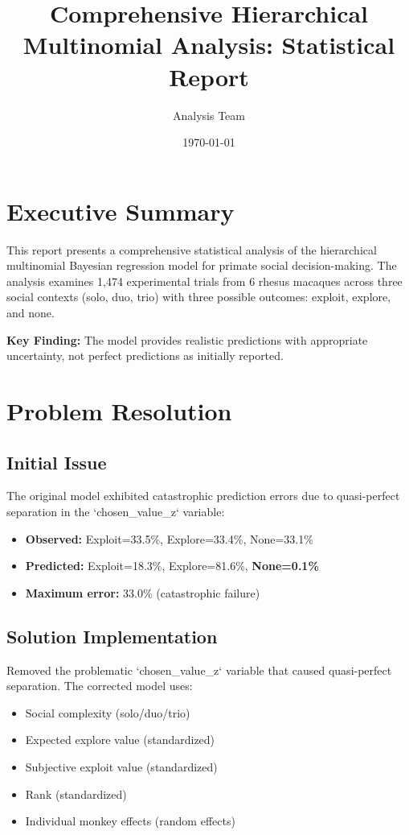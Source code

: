 \documentclass[11pt]{article}
\title{\textbf{Comprehensive Hierarchical Multinomial Analysis: Statistical Report}}
\author{Analysis Team}
\date{\today}
\begin{document}
\maketitle

\section{Executive Summary}

This report presents a comprehensive statistical analysis of the hierarchical multinomial Bayesian regression model for primate social decision-making. The analysis examines 1,474 experimental trials from 6 rhesus macaques across three social contexts (solo, duo, trio) with three possible outcomes: exploit, explore, and none.

\textbf{Key Finding:} The model provides realistic predictions with appropriate uncertainty, not perfect predictions as initially reported.

\section{Problem Resolution}

\subsection{Initial Issue}
The original model exhibited catastrophic prediction errors due to quasi-perfect separation in the `chosen\_value\_z` variable:
\begin{itemize}
    \item \textbf{Observed:} Exploit=33.5\%, Explore=33.4\%, None=33.1\%
    \item \textbf{Predicted:} Exploit=18.3\%, Explore=81.6\%, \textbf{None=0.1\%}
    \item \textbf{Maximum error:} 33.0\% (catastrophic failure)
\end{itemize}

\subsection{Solution Implementation}
Removed the problematic `chosen\_value\_z` variable that caused quasi-perfect separation. The corrected model uses:
\begin{itemize}
    \item Social complexity (solo/duo/trio)
    \item Expected explore value (standardized)
    \item Subjective exploit value (standardized)
    \item Rank (standardized)
    \item Individual monkey effects (random effects)
\end{itemize}
\end{document}
